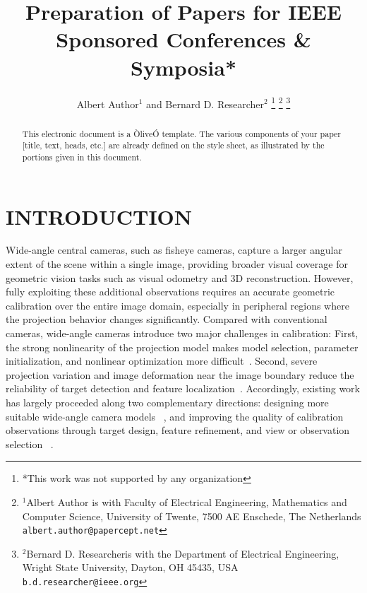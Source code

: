 \documentclass[letterpaper, 10 pt, conference]{ieeeconf}  %
\title{\LARGE \bf
Preparation of Papers for IEEE Sponsored Conferences \& Symposia*
}
\author{Albert Author$^{1}$ and Bernard D. Researcher$^{2}$%
\thanks{*This work was not supported by any organization}%
\thanks{$^{1}$Albert Author is with Faculty of Electrical Engineering, Mathematics and Computer Science,
        University of Twente, 7500 AE Enschede, The Netherlands
        {\tt\small albert.author@papercept.net}}%
\thanks{$^{2}$Bernard D. Researcheris with the Department of Electrical Engineering, Wright State University,
        Dayton, OH 45435, USA
        {\tt\small b.d.researcher@ieee.org}}%
}
\begin{document}
\maketitle
\thispagestyle{empty}
\pagestyle{empty}


\begin{abstract}

This electronic document is a ÒliveÓ template. The various components of your paper [title, text, heads, etc.] are already defined on the style sheet, as illustrated by the portions given in this document.

\end{abstract}


\section{INTRODUCTION}

Wide-angle central cameras, such as fisheye cameras, capture a
larger angular extent of the scene within a single image, providing
broader visual coverage for geometric vision tasks such as visual
odometry and 3D reconstruction. However, fully exploiting these
additional observations requires an accurate geometric calibration
over the entire image domain, especially in peripheral regions where
the projection behavior changes significantly. Compared with
conventional cameras, wide-angle cameras introduce two major
challenges in calibration: First, the strong nonlinearity of the projection model makes model
selection, parameter initialization, and nonlinear optimization more
difficult~\cite{polic2020uncertainty,lochman2021babelcalib}. Second, severe projection
variation and image deformation near the image boundary reduce the
reliability of target detection and feature localization~\cite{duisterhof2022tartancalib}. Accordingly, existing work has
largely proceeded along two complementary directions: designing more suitable wide-angle camera models
~\cite{kannala2006generic,usenko2018double}, and improving the quality of calibration
observations through target design, feature refinement, and
view or observation selection
~\cite{ha2017deltille,peng2019calibration,
duisterhof2022tartancalib,liu2026observation}.
\end{document}
